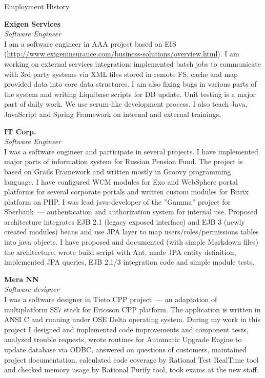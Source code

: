 \begin{rubric}{Employment History}

  \parbox{\EmpHistoryBlock}{
  \textbf{Exigen Services}\\
  \textit{Software Engineer}\\
  I am a software engineer in AAA project based on EIS
  (\url{http://www.exigeninsurance.com/business-solutions/overview.html}).
  I am working on external services integration: implemented batch jobs to
  communicate with 3rd party systems via XML files stored in remote FS,
  cache and map provided data into core data structures. I am also fixing
  bugs in various parts of the system and writing Liquibase scripts for DB
  update. Unit testing is a major part of daily work.
  We use scrum-like development process.
  I also teach Java, JavaScript and Spring Framework on internal and
  external trainings.
  }

  \parbox{\EmpHistoryBlock}{
  \textbf{IT Corp.}\\
  \textit{Software Engineer}\\
  I was a software engineer and participate in several projects.  I
  have implemented major parts of information system for Russian
  Pension Fund.  The project is based on Grails Framework and written
  mostly in Groovy programming language.
  I have configured WCM modules for Exo and WebSphere portal
  platforms for several corporate portals and written custom modules for
  Bitrix platform on PHP.
  I was lead java-developer of the ''Gamma'' project for Sberbank~--- 
  authentication and authorization system for internal use. Proposed
  architecture integrates EJB 2.1 (legacy exposed interface) and EJB 3
  (newly created modules) beans and use JPA layer to map
  users/roles/permissions tables into java objects. I have proposed and
  documented (with simple Markdown files) the architecture, wrote
  build script with Ant, made JPA entity definition, implemented JPA
  queries, EJB 2.1/3 integration code and simple module tests.
  }

  \parbox{\EmpHistoryBlock}{
  \textbf{Mera NN}\\
  \textit{Software designer}\\
  I was a software designer in Tieto CPP project~--- an adaptation of
  multiplatform SS7 stack for Ericsson CPP platform. The application
  is written in ANSI C and running under OSE Delta operating
  system. During my work in this project I designed and implemented
  code improvements and component tests, analyzed trouble requests,
  wrote routines for Automatic Upgrade Engine to update database via
  ODBC, answered on questions of customers, maintained project
  documentation, calculated code coverage by Rational Test RealTime
  tool and checked memory usage by Rational Purify tool, took exams
  at the new staff.
  }


\end{rubric}

